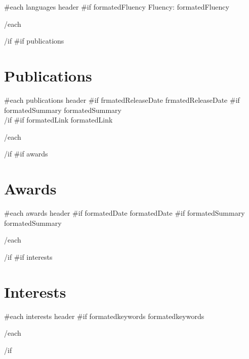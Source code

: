 \documentclass{article}
\begin{document}
\begin{paracol}{2}
\begin{leftcolumn*}
{  {{#each languages}}
    {{ header }}\newline
    {{#if formatedFluency}} Fluency: {{ formatedFluency }}
    \par
  {{/each}}
}{{/if}}
{{#if publications}}\section*{Publications}{
  {{#each publications}}
    {{ header }}\newline
    {{#if frmatedReleaseDate}}{{ frmatedReleaseDate }}
    {{#if formatedSummary}}
      {{ formatedSummary }}
      \\
    {{/if}}
    {{#if formatedLink}}{{ formatedLink }}
    \par
  {{/each}}
}{{/if}}
{{#if awards}}\section*{Awards}{
  {{#each awards}}
    {{ header }}\newline
    {{#if formatedDate}}{{ formatedDate }}
    {{#if formatedSummary}}{{ formatedSummary }}
    \par
  {{/each}}
}{{/if}}
{{#if interests}}\section*{Interests}{
  {{#each interests}}
    {{ header }}\newline
    {{#if formatedkeywords}}{{ formatedkeywords }}
    \par
  {{/each}}
}{{/if}}

\end{leftcolumn*}


\end{paracol}
\end{document}
